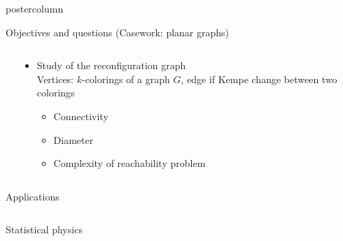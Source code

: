 \begin{frame}
\begin{beamercolorbox}[center,wd=\textwidth]{postercolumn}
\begin{minipage}[T]{.97\textwidth}
\begin{block}{Objectives and questions (Casework: planar graphs)}
\begin{columns}
\begin{column}{.49\textwidth}
          \end{column}
          \begin{column}{.49\textwidth}
            \begin{itemize}
            \item Study of the reconfiguration graph\\ {\small Vertices: $k$-colorings of a
                graph $G$, edge if Kempe change between two colorings}
              \begin{itemize}
              \item Connectivity 
              \item Diameter
              \item Complexity of reachability problem
              \end{itemize}
            \end{itemize}
          \end{column}
        \end{columns}
      \end{block}
      
      \begin{block}{Applications}
        \begin{columns}
          \begin{column}{.45\textwidth}
            \begin{block}{Statistical physics}
              \centering
\end{block}
\end{column}
\end{columns}
\end{block}
\end{minipage}
\end{beamercolorbox}
\end{frame}
